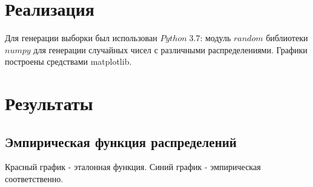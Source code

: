 \documentclass[a4]{article}
\begin{document}
	\section{Реализация}
	Для генерации выборки был использован $Python\;3.7$: модуль $random$ библиотеки $numpy$ для генерации случайных чисел с различными распределениями. Графики построены средствами matplotlib.
	\newpage
	\section{Результаты}
		\subsection{Эмпирическая функция распределений}
		Красный график - эталонная функция. Синий график - эмпирическая соответственно.
		\begin{center}
			

\end{center}
\end{document}
